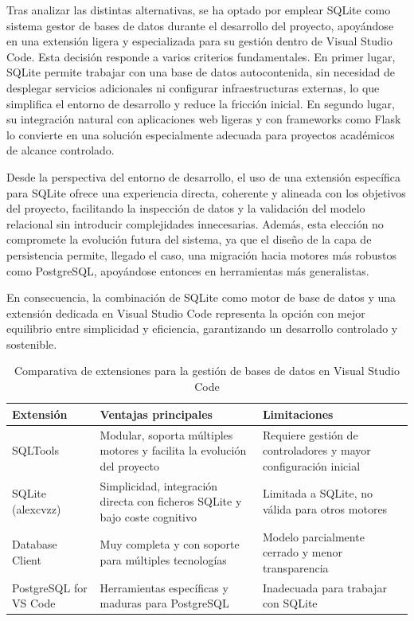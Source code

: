 Tras analizar las distintas alternativas, se ha optado por emplear SQLite como sistema gestor de bases de datos durante el desarrollo del proyecto, apoyándose en una extensión ligera y especializada para su gestión dentro de Visual Studio Code. Esta decisión responde a varios criterios fundamentales. En primer lugar, SQLite permite trabajar con una base de datos autocontenida, sin necesidad de desplegar servicios adicionales ni configurar infraestructuras externas, lo que simplifica el entorno de desarrollo y reduce la fricción inicial. En segundo lugar, su integración natural con aplicaciones web ligeras y con frameworks como Flask lo convierte en una solución especialmente adecuada para proyectos académicos de alcance controlado.

Desde la perspectiva del entorno de desarrollo, el uso de una extensión específica para SQLite ofrece una experiencia directa, coherente y alineada con los objetivos del proyecto, facilitando la inspección de datos y la validación del modelo relacional sin introducir complejidades innecesarias. Además, esta elección no compromete la evolución futura del sistema, ya que el diseño de la capa de persistencia permite, llegado el caso, una migración hacia motores más robustos como PostgreSQL, apoyándose entonces en herramientas más generalistas.

En consecuencia, la combinación de SQLite como motor de base de datos y una extensión dedicada en Visual Studio Code representa la opción con mejor equilibrio entre simplicidad y eficiencia, garantizando un desarrollo controlado y sostenible.

\begin{table}[h]
	\centering
	\renewcommand{\arraystretch}{1.3}
	\begin{tabular}{p{} p{} p{}}
		\hline
		\textbf{Extensión} & \textbf{Ventajas principales} & \textbf{Limitaciones} \\
		\hline
		SQLTools & Modular, soporta múltiples motores y facilita la evolución del proyecto & Requiere gestión de controladores y mayor configuración inicial \\
		\hline
		SQLite (alexcvzz) & Simplicidad, integración directa con ficheros SQLite y bajo coste cognitivo & Limitada a SQLite, no válida para otros motores \\
		\hline
		Database Client & Muy completa y con soporte para múltiples tecnologías & Modelo parcialmente cerrado y menor transparencia \\
		\hline
		PostgreSQL for VS Code & Herramientas específicas y maduras para PostgreSQL & Inadecuada para trabajar con SQLite \\
		\hline
	\end{tabular}
	\caption[Extensiones para la gestión de BBDD en VS Code]{Comparativa de extensiones para la gestión de bases de datos en Visual Studio Code}
	\label{tab:comparativa_extensiones_bd}
\end{table}


